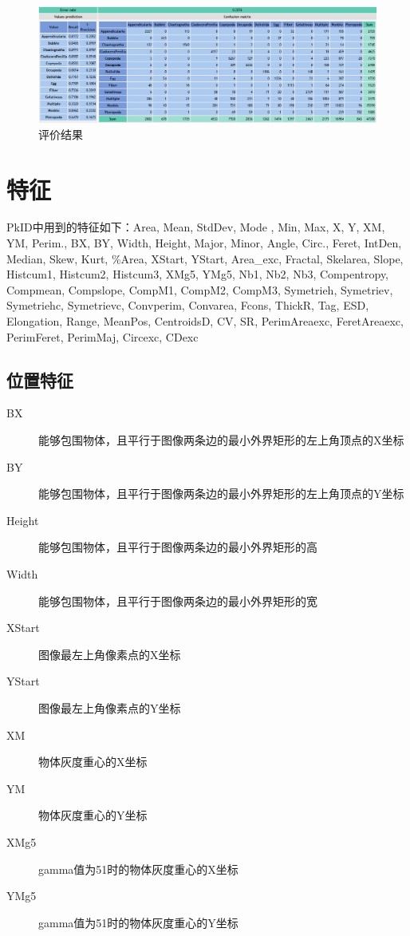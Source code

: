 \documentclass[12pt]{article}
\begin{document}
\begin{figure}[!ht]
\centering
\includegraphics[width=1.0\textwidth]{withoutposition.png}
\caption{评价结果}
\label{fig: withoutposition}
\end{figure} 

\section{特征}

PkID中用到的特征如下：Area, Mean, StdDev, Mode	, Min, Max, X, Y, XM, YM, Perim., BX, BY, Width, Height, Major, Minor, Angle, Circ., Feret, IntDen, Median, Skew, Kurt, \%Area, XStart, YStart, Area\_exc, Fractal, Skelarea, Slope, Histcum1, Histcum2, Histcum3, XMg5, YMg5, Nb1, Nb2, Nb3, Compentropy, Compmean, Compslope, CompM1, CompM2, CompM3, Symetrieh, Symetriev, Symetriehc, Symetrievc, Convperim, Convarea, Fcons, ThickR, Tag, ESD, Elongation, Range, MeanPos, CentroidsD, CV, SR, PerimAreaexc, FeretAreaexc, PerimFeret, PerimMaj, Circexc, CDexc

\subsection{位置特征}

\begin{description}
\item[BX] 能够包围物体，且平行于图像两条边的最小外界矩形的左上角顶点的X坐标 
\item[BY] 能够包围物体，且平行于图像两条边的最小外界矩形的左上角顶点的Y坐标 
\item[Height] 能够包围物体，且平行于图像两条边的最小外界矩形的高
\item[Width] 能够包围物体，且平行于图像两条边的最小外界矩形的宽
\item[XStart] 图像最左上角像素点的X坐标
\item[YStart] 图像最左上角像素点的Y坐标
\item[XM] 物体灰度重心的X坐标
\item[YM] 物体灰度重心的Y坐标
\item[XMg5] gamma值为51时的物体灰度重心的X坐标
\item[YMg5] gamma值为51时的物体灰度重心的Y坐标
\end{description}
\end{document}
